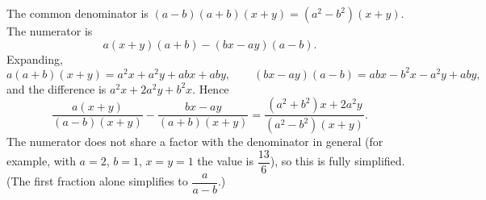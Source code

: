 The common denominator is $(a-b)(a+b)(x+y)=(a^2-b^2)(x+y)$. The numerator is
\[
a(x+y)(a+b)-(bx-ay)(a-b).
\]
Expanding,
\[
a(a+b)(x+y)=a^2x+a^2y+abx+aby,\qquad (bx-ay)(a-b)=abx-b^2x-a^2y+aby,
\]
and the difference is $a^2x+2a^2y+b^2x$. Hence
\[
\dfrac{a(x+y)}{(a-b)(x+y)}-\dfrac{bx-ay}{(a+b)(x+y)}=\boxed{\dfrac{(a^2+b^2)x+2a^2y}{(a^2-b^2)(x+y)}}.
\]
The numerator does not share a factor with the denominator in general (for example, with $a=2$, $b=1$, $x=y=1$ the value is $\dfrac{13}{6}$), so this is fully simplified. (The first fraction alone simplifies to $\dfrac{a}{a-b}$.)
